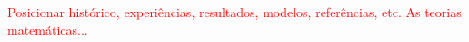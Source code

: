 \textcolor{red}{Posicionar histórico, experiências, resultados, modelos, referências, etc. As teorias matemáticas...}
